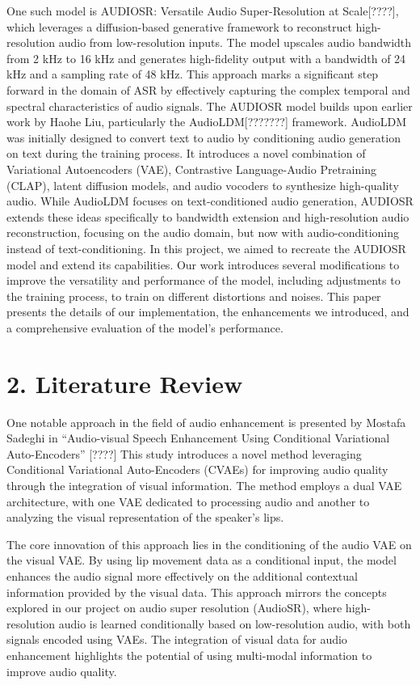 \documentclass[
  ]{scrartcl}
\begin{document}
One such model is AUDIOSR: Versatile Audio Super-Resolution at
Scale{[}????{]}, which leverages a diffusion-based generative framework
to reconstruct high-resolution audio from low-resolution inputs. The
model upscales audio bandwidth from 2 kHz to 16 kHz and generates
high-fidelity output with a bandwidth of 24 kHz and a sampling rate of
48 kHz. This approach marks a significant step forward in the domain of
ASR by effectively capturing the complex temporal and spectral
characteristics of audio signals. The AUDIOSR model builds upon earlier
work by Haohe Liu, particularly the AudioLDM{[}???????{]} framework.
AudioLDM was initially designed to convert text to audio by conditioning
audio generation on text during the training process. It introduces a
novel combination of Variational Autoencoders (VAE), Contrastive
Language-Audio Pretraining (CLAP), latent diffusion models, and audio
vocoders to synthesize high-quality audio. While AudioLDM focuses on
text-conditioned audio generation, AUDIOSR extends these ideas
specifically to bandwidth extension and high-resolution audio
reconstruction, focusing on the audio domain, but now with
audio-conditioning instead of text-conditioning. In this project, we
aimed to recreate the AUDIOSR model and extend its capabilities. Our
work introduces several modifications to improve the versatility and
performance of the model, including adjustments to the training process,
to train on different distortions and noises. This paper presents the
details of our implementation, the enhancements we introduced, and a
comprehensive evaluation of the model's performance.

\section{2. Literature Review}\label{literature-review}

One notable approach in the field of audio enhancement is presented by
Mostafa Sadeghi in ``Audio-visual Speech Enhancement Using Conditional
Variational Auto-Encoders'' {[}????{]} This study introduces a novel
method leveraging Conditional Variational Auto-Encoders (CVAEs) for
improving audio quality through the integration of visual information.
The method employs a dual VAE architecture, with one VAE dedicated to
processing audio and another to analyzing the visual representation of
the speaker's lips.

The core innovation of this approach lies in the conditioning of the
audio VAE on the visual VAE. By using lip movement data as a conditional
input, the model enhances the audio signal more effectively on the
additional contextual information provided by the visual data. This
approach mirrors the concepts explored in our project on audio super
resolution (AudioSR), where high-resolution audio is learned
conditionally based on low-resolution audio, with both signals encoded
using VAEs. The integration of visual data for audio enhancement
highlights the potential of using multi-modal information to improve
audio quality.
\end{document}
